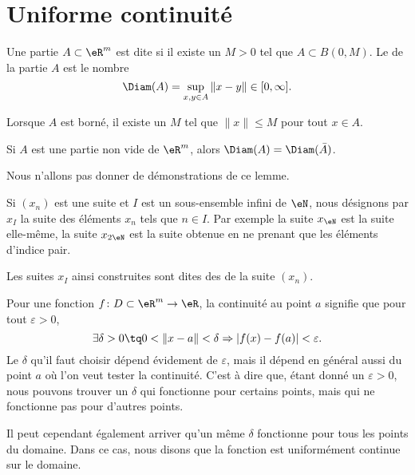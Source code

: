\section{Uniforme continuité}		\label{SecUnifContinue}

\begin{definition}
	Une partie $A\subset\eR^m$ est dite  si il existe un $M>0$ tel que $A\subset B(0,M)$. Le  de la partie $A$ est le nombre
	\begin{equation}
		\Diam(A)=\sup_{x,y\in A}\| x-y \|\in\mathopen[ 0 , \infty \mathclose].
	\end{equation}
\end{definition}
Lorsque $A$ est borné, il existe un $M$ tel que $\| x \|\leq M$ pour tout $x\in A$.

\begin{lemma}
	Si $A$ est une partie non vide de $\eR^m$, alors $\Diam(A)=\Diam(\bar A)$.
\end{lemma}
Nous n'allons pas donner de démonstrations de ce lemme.


Si $(x_n)$ est une suite et $I$ est un sous-ensemble infini de $\eN$, nous désignons par $x_I$ la suite des éléments $x_n$ tels que $n\in I$. Par exemple la suite $x_{\eN}$ est la suite elle-même, la suite $x_{2\eN}$ est la suite obtenue en ne prenant que les éléments d'indice pair.

Les suites $x_I$ ainsi construites sont dites des  de la suite $(x_n)$.


Pour une fonction $f\colon D\subset\eR^m\to \eR$, la continuité au point $a$ signifie que pour tout $\varepsilon>0$,
\begin{equation}
	\exists\delta>0\tq 0<\| x-a \|<\delta\Rightarrow | f(x)-f(a) |<\varepsilon.
\end{equation}
Le $\delta$ qu'il faut choisir dépend évidement de $\varepsilon$, mais il dépend en général aussi du point $a$ où l'on veut tester la continuité. C'est à dire que, étant donné un $\varepsilon>0$, nous pouvons trouver un $\delta$ qui fonctionne pour certains points, mais qui ne fonctionne pas pour d'autres points.

Il peut cependant également arriver qu'un même $\delta$ fonctionne pour tous les points du domaine. Dans ce cas, nous disons que la fonction est uniformément continue sur le domaine.

